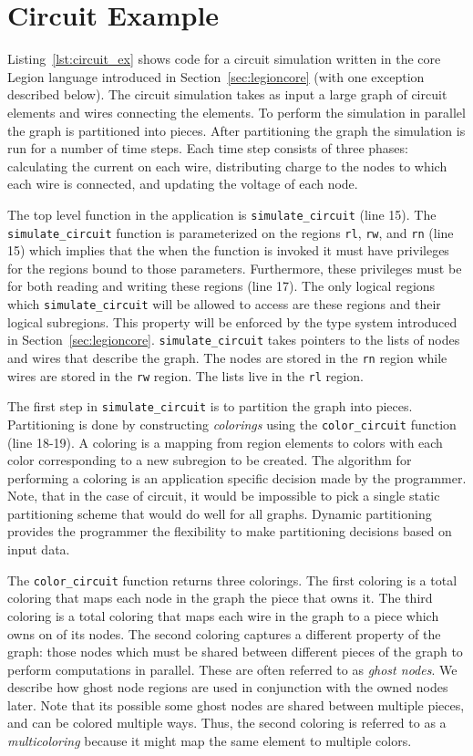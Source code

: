 
\section{Circuit Example}
\label{sec:example}

Listing~\ref{lst:circuit_ex} shows code for a
circuit simulation written in the core Legion language introduced in
Section~\ref{sec:legioncore} (with one exception described below).  The
circuit simulation takes as input a large graph of circuit elements and wires
connecting the elements.  To perform the simulation in parallel the graph
is partitioned into pieces.  After partitioning
the graph the simulation is run for a number of time steps.  Each time step
consists of three phases: calculating the current on each wire, distributing
charge to the nodes to which each wire is connected, and updating the voltage
of each node.

The top level function in the application is {\tt simulate\_circuit} (line 15).  The {\tt simulate\_circuit} 
function is parameterized on the regions {\tt rl}, {\tt rw}, and {\tt rn} (line 15) which 
implies that the when the function is invoked it must have privileges for the regions 
bound to those parameters.  Furthermore, these privileges must be for both reading 
and writing these regions (line 17).  The only logical regions which {\tt simulate\_circuit} will 
be allowed to access are these regions and their logical subregions.  This property will be 
enforced by the type system introduced in Section~\ref{sec:legioncore}.  {\tt simulate\_circuit}
takes pointers to the lists of nodes and wires that describe the graph.  The nodes
are stored in the {\tt rn} region while wires are stored in the {\tt rw} region.  The
lists live in the {\tt rl} region.  

The first step in {\tt simulate\_circuit} is to partition the graph into pieces.  Partitioning
is done by constructing {\em colorings} using the {\tt color\_circuit} function (line 18-19).  A
coloring is a mapping from region elements to colors with each color corresponding to a new subregion
to be created.  The algorithm for performing a coloring is an application specific decision made by 
the programmer.  Note, that in the case of circuit, it would be impossible to
pick a single static partitioning scheme that would do well for all graphs.  Dynamic partitioning
provides the programmer the flexibility to make partitioning decisions based on input data.

The {\tt color\_circuit} function returns three colorings.  The first coloring is a total 
coloring that maps each node in the graph the piece that owns it.  The third coloring is a total
coloring that maps each wire in the graph to a piece which owns on of its nodes.  The second coloring captures a
different property of the graph: those nodes which must be shared between different pieces of the
graph to perform computations in parallel.  These are often referred to as {\em ghost nodes}.  We
describe how ghost node regions are used in conjunction with the owned nodes later.
Note that its possible some ghost nodes are shared between multiple pieces, and can be colored multiple ways.  Thus,
the second coloring is referred to as a {\em multicoloring} because it might map the same element
to multiple colors.

